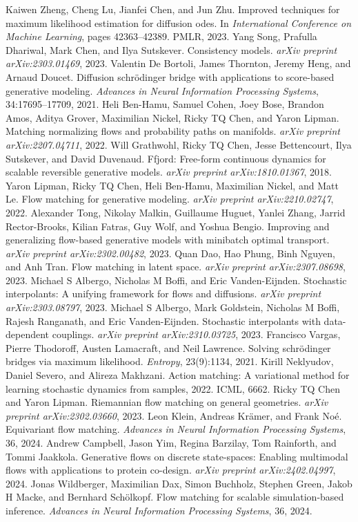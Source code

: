 \begin{chapterreferences}
 Kaiwen Zheng, Cheng Lu, Jianfei Chen, and Jun Zhu. Improved techniques for maximum likelihood estimation for diffusion odes. In \emph{International Conference on Machine Learning}, pages 42363–42389. PMLR, 2023.
 Yang Song, Prafulla Dhariwal, Mark Chen, and Ilya Sutskever. Consistency models. \emph{arXiv preprint arXiv:2303.01469}, 2023.
 Valentin De Bortoli, James Thornton, Jeremy Heng, and Arnaud Doucet. Diffusion schrödinger bridge with applications to score-based generative modeling. \emph{Advances in Neural Information Processing Systems}, 34:17695–17709, 2021.
 Heli Ben-Hamu, Samuel Cohen, Joey Bose, Brandon Amos, Aditya Grover, Maximilian Nickel, Ricky TQ Chen, and Yaron Lipman. Matching normalizing flows and probability paths on manifolds. \emph{arXiv preprint arXiv:2207.04711}, 2022.
 Will Grathwohl, Ricky TQ Chen, Jesse Bettencourt, Ilya Sutskever, and David Duvenaud. Ffjord: Free-form continuous dynamics for scalable reversible generative models. \emph{arXiv preprint arXiv:1810.01367}, 2018.
 Yaron Lipman, Ricky TQ Chen, Heli Ben-Hamu, Maximilian Nickel, and Matt Le. Flow matching for generative modeling. \emph{arXiv preprint arXiv:2210.02747}, 2022.
 Alexander Tong, Nikolay Malkin, Guillaume Huguet, Yanlei Zhang, Jarrid Rector-Brooks, Kilian Fatras, Guy Wolf, and Yoshua Bengio. Improving and generalizing flow-based generative models with minibatch optimal transport. \emph{arXiv preprint arXiv:2302.00482}, 2023.
 Quan Dao, Hao Phung, Binh Nguyen, and Anh Tran. Flow matching in latent space. \emph{arXiv preprint arXiv:2307.08698}, 2023.
 Michael S Albergo, Nicholas M Boffi, and Eric Vanden-Eijnden. Stochastic interpolants: A unifying framework for flows and diffusions. \emph{arXiv preprint arXiv:2303.08797}, 2023.
 Michael S Albergo, Mark Goldstein, Nicholas M Boffi, Rajesh Ranganath, and Eric Vanden-Eijnden. Stochastic interpolants with data-dependent couplings. \emph{arXiv preprint arXiv:2310.03725}, 2023.
 Francisco Vargas, Pierre Thodoroff, Austen Lamacraft, and Neil Lawrence. Solving schrödinger bridges via maximum likelihood. \emph{Entropy}, 23(9):1134, 2021.
 Kirill Neklyudov, Daniel Severo, and Alireza Makhzani. Action matching: A variational method for learning stochastic dynamics from samples, 2022. ICML, 6662.
 Ricky TQ Chen and Yaron Lipman. Riemannian flow matching on general geometries. \emph{arXiv preprint arXiv:2302.03660}, 2023.
 Leon Klein, Andreas Krämer, and Frank Noé. Equivariant flow matching. \emph{Advances in Neural Information Processing Systems}, 36, 2024.
 Andrew Campbell, Jason Yim, Regina Barzilay, Tom Rainforth, and Tommi Jaakkola. Generative flows on discrete state-spaces: Enabling multimodal flows with applications to protein co-design. \emph{arXiv preprint arXiv:2402.04997}, 2024.
 Jonas Wildberger, Maximilian Dax, Simon Buchholz, Stephen Green, Jakob H Macke, and Bernhard Schölkopf. Flow matching for scalable simulation-based inference. \emph{Advances in Neural Information Processing Systems}, 36, 2024.
\end{chapterreferences}
